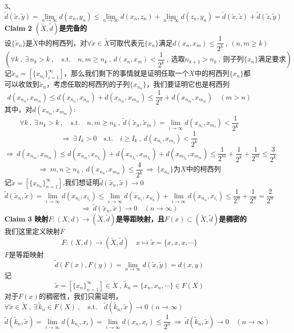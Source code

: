 3、
\[\tilde{d}(\tilde{x},\tilde{y})=\lim_{n \to \infty}d(x_n,y_n) \leq \lim_{n \to \infty}d(x_n,z_n)+\lim_{n \to \infty}d(z_n,y_n)=\tilde{d}(\tilde{x},\tilde{z})+\tilde{d}(\tilde{z},\tilde{y})\]
\textbf{Claim 2 $(\tilde{X},\tilde{d})$是完备的}\\
\[\text{设}\{\tilde{x}_n\}\text{是}\tilde{X}\text{中的柯西列，对}\forall \tilde{x} \in \tilde{X}\text{可取代表元}\{x_n\}\text{满足}d(x_n,x_m)\leq \frac{1}{2^k} \ , \ (n,m \geq k)\]
\[(\forall k \ , \ \exists \, n_k>k \ , \quad \text{s.t.} \quad n,m \geq n_k \ , \ d(x_n,x_m)<\frac{1}{2^k} \ , \ \text{选取}n_{k+1}>n_k \ , \ \text{则子列}\{x_n\}\text{满足要求})\]
记$\tilde{x}_n=[\{x_{n_i}\}_{i=1}^{\infty}]$，那么我们剩下的事情就是证明任取一个$X$中的柯西列$\{x_n\}$都可以收敛到$\tilde{x}_n$，考虑任取的柯西列的子列$\{x_{n_n}\}$，我们要证明它也是柯西列
\[d(x_{n_n},x_{m_m}) \leq d(x_{n_n},x_{n_m})+d(x_{n_m},x_{m_m}) \leq \frac{1}{2^n}+d(x_{n_m},x_{m_m}) \quad (m>n)\]
其中，对$d(x_{n_m},x_{m_m})$:
\[\forall k \ , \ \exists \, n_k>k \ , \quad \text{s.t.} \quad n,m \geq n_k \ , \ \tilde{d}(\tilde{x}_n,\tilde{x}_m)=\lim_{i \to \infty}d(x_{n_i},x_{m_i})<\frac{1}{2^k}\]
\[\Rightarrow \ \exists \, I_k>0 \quad \text{s.t.} \quad i \geq I_k \ , \ d(x_{n_i},x_{m_i})<\frac{1}{2^k}\]
\[\Rightarrow \ d(x_{n_m},x_{m_m}) \leq d(x_{n_m},x_{n_{I_k}})+d(x_{n_{I_k}},x_{m_{I_k}})+d(x_{m_{I_k}},x_{m_m}) \leq \frac{1}{2^m}+\frac{1}{2^k}+\frac{1}{2^m} \leq \frac{3}{2^k}\]
\[\Rightarrow \ m,n \geq n_k \ , \ d(x_{n_n},x_{m_m}) \leq \frac{4}{2^k} \ \Rightarrow \ \{x_{n_n}\}\text{为}X\text{中的柯西列}\]
记$\tilde{x}=[\{x_{n_n}\}_{n=1}^{\infty}]$,我们想证明$\tilde{d}(\tilde{x}_n,\tilde{x}) \to 0$
\[\tilde{d}(\tilde{x}_n,\tilde{x})=\lim_{i \to \infty}d(x_{n_i},x_{i_i}) \leq \lim_{i \to \infty}d(x_{n_i},x_{n_n})+\lim_{i \to \infty}d(x_{n_n},x_{i_i}) \leq \frac{1}{2^n}+\frac{1}{2^n}=\frac{2}{2^n}\]
\[\Rightarrow \ \tilde{d}(\tilde{x}_n,\tilde{x}) \to 0 \quad (n \to \infty)\]
\textbf{Claim 3 映射$F:(X,d) \rightarrow (\tilde{X},\tilde{d})$是等距映射，且$F(x) \subset (\tilde{X},\tilde{d})$是稠密的}\\
我们这里定义映射$F$
\[F:(X,d) \to (\tilde{X},\tilde{d}) \quad x \mapsto \tilde{x}=\{x,x,x,\cdots\}\]
$F$是等距映射
\[\tilde{d}(F(x),F(y))=\lim_{n \to \infty}d(\tilde{x},\tilde{y})=d(x,y)\]
记
\[\tilde{x}=[\{x_n\}_{n=1}^{\infty}] \in \tilde{X} \ , \ \tilde{k}_n=\{x_n,x_n,\cdots\} \in F(X)\]
对于$F(x)$的稠密性，我们只需证明，$\forall \tilde{x} \in \tilde{X} \ , \ \exists \, \tilde{k}_n \in F(X) \ , \quad \text{s.t.} \quad \tilde{d}(\tilde{k}_n,\tilde{x}) \to 0 \ (n \to \infty)$
\[\tilde{d}(\tilde{k}_n,\tilde{x})=\lim_{i \to \infty}d(k_{n_i},x_i)=\lim_{i \to \infty}d(x_n,x_i) \leq \frac{1}{2^n} \ \Rightarrow \ \tilde{d}(\tilde{k}_n,\tilde{x}) \to 0 \quad (n \to \infty)\]

